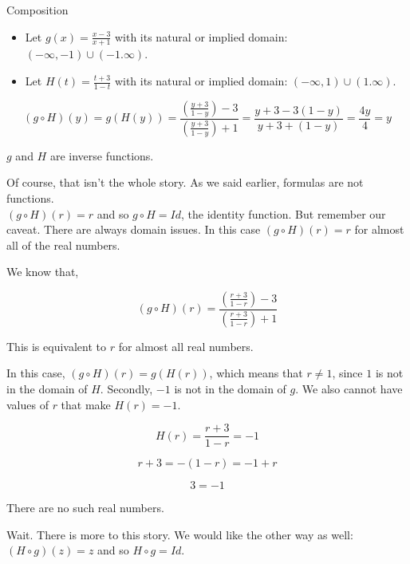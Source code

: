 \documentclass{ximera}
\begin{document}
\begin{example} Composition



\begin{itemize}
\item Let $g(x) = \frac{x-3}{x+1}$ with its natural or implied domain: $(-\infty, -1) \cup (-1. \infty)$. \\

\item Let $H(t) = \frac{t+3}{1-t}$ with its natural or implied domain: $(-\infty, 1) \cup (1. \infty)$.
\end{itemize}



\[
(g \circ H)(y) = g(H(y)) = \frac{\left( \frac{y+3}{1-y} \right) - 3}{\left(  \frac{y+3}{1-y}\right) + 1} = \frac{y+3-3(1-y)}{y+3+(1-y)} = \frac{4y}{4} = y
\]



$g$ and $H$ are inverse functions.




\end{example}

Of course, that isn't the whole story.  As we said earlier, formulas are not functions. \\

$(g \circ H)(r) = r$ and so $g \circ H = Id$, the identity function.  But remember our caveat.  There are always domain issues.  In this case $(g \circ H)(r) = r$ for almost all of the real numbers.

We know that, 


\[
(g \circ H)(r) = \frac{\left( \frac{r+3}{1-r} \right) - 3}{\left(  \frac{r+3}{1-r}\right) + 1} 
\]


This is equivalent to $r$ for almost all real numbers.


In this case, $(g \circ H)(r) = g(H(r))$, which means that $r \ne 1$, since $1$ is not in the domain of $H$.  Secondly, $-1$ is not in the domain of $g$.  We also cannot have values of $r$ that make $H(r) = -1$.




\[
H(r) = \frac{r+3}{1-r} = -1
\]

\[
r + 3 = -(1-r) = -1 + r
\]


\[
3 = -1
\]


There are no such real numbers.


Wait.  There is more to this story. We would like the other way as well: $(H \circ g)(z) = z$ and so $H \circ g = Id$.
\end{document}
